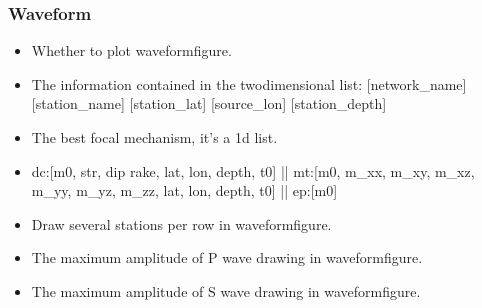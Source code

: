 \documentclass[a4paper,10pt,english,openany]{sphinxmanual}
\begin{document}
\subsubsection{Waveform}
\label{\detokenize{tutorials/S5_Plot_Result:waveform}}
\begin{itemize}
\item {} 
Whether to plot waveform\sphinxhyphen{}figure.

\end{itemize}

\begin{itemize}
\item {} 
The information contained in the two\sphinxhyphen{}dimensional list: {[}network\_name{]} {[}station\_name{]}  {[}station\_lat{]}   {[}source\_lon{]}    {[}station\_depth{]}

\end{itemize}

\begin{itemize}
\item {} 
The best focal mechanism, it’s a 1\sphinxhyphen{}d list.

\item {} 
dc:{[}m0, str, dip rake, lat, lon, depth, t0{]} || mt:{[}m0, m\_xx, m\_xy, m\_xz, m\_yy, m\_yz, m\_zz, lat, lon, depth, t0{]} || ep:{[}m0{]}

\end{itemize}

\begin{itemize}
\item {} 
Draw several stations per row in waveform\sphinxhyphen{}figure.

\end{itemize}

\begin{itemize}
\item {} 
The maximum amplitude of P wave drawing in waveform\sphinxhyphen{}figure.

\end{itemize}

\begin{itemize}
\item {} 
The maximum amplitude of S wave drawing in waveform\sphinxhyphen{}figure.

\end{itemize}
\end{document}
